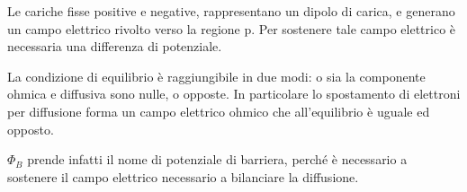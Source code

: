 \documentclass[../template]{subfiles}
\begin{document}
Le cariche fisse positive e negative, rappresentano un dipolo di carica, e generano un campo elettrico rivolto verso la regione p.
Per sostenere tale campo elettrico è necessaria una differenza di potenziale.

La condizione di equilibrio è raggiungibile in due modi: o sia la componente ohmica e diffusiva sono nulle, o opposte.
In particolare lo spostamento di elettroni per diffusione forma un campo elettrico ohmico che all'equilibrio è uguale ed opposto.

$\Phi_B$ prende infatti il nome di potenziale di barriera, perché è necessario a sostenere il campo elettrico necessario a bilanciare la diffusione.
\end{document}
